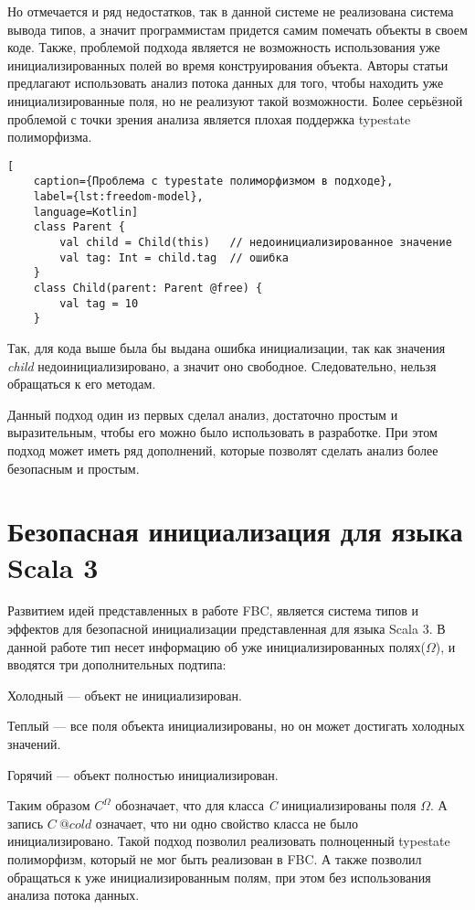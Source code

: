 Но отмечается и ряд недостатков, так в данной системе не реализована система вывода типов,
а значит программистам придется самим помечать объекты в своем коде.
Также, проблемой подхода является не возможность использования уже инициализированных полей во время конструирования объекта.
Авторы статьи предлагают использовать анализ потока данных для того, чтобы находить уже инициализированные поля,
но не реализуют такой возможности.
Более серьёзной проблемой с точки зрения анализа является плохая поддержка typestate полиморфизма.
\begin{lstlisting}[
    caption={Проблема c typestate полиморфизмом в подходе},
    label={lst:freedom-model},
    language=Kotlin]
    class Parent {
        val child = Child(this)   // недоинициализированное значение
        val tag: Int = child.tag  // ошибка
    }
    class Child(parent: Parent @free) {
        val tag = 10
    }
\end{lstlisting}
Так, для кода выше была бы выдана ошибка инициализации, так как значения \emph{child} недоинициализировано,
а значит оно свободное.
Следовательно, нельзя обращаться к его методам.

Данный подход один из первых сделал анализ, достаточно простым и выразительным, чтобы его можно было использовать в разработке.
При этом подход может иметь ряд дополнений, которые позволят сделать анализ более безопасным и простым.

\section{Безопасная инициализация для языка Scala 3}\label{sec:безопасная-инициализация-для-языка-scala-3}

Развитием идей представленных в работе FBC,
является система типов и эффектов для безопасной инициализации представленная для языка Scala 3\cite{safe-initialization-for-scala}.
В данной работе тип несет информацию об уже инициализированных полях($\Omega$), и вводятся три дополнительных подтипа:
\begin{itemize*}
    \item Холодный --- объект не инициализирован.
    \item Теплый --- все поля объекта инициализированы, но он может достигать холодных значений.
    \item Горячий --- объект полностью инициализирован.
\end{itemize*}
Таким образом $C^\Omega$ обозначает, что для класса \emph{C} инициализированы поля $\Omega$.
А запись $C~@cold$ означает, что ни одно свойство класса не было инициализировано.
Такой подход позволил реализовать полноценный typestate полиморфизм, который не мог быть реализован в FBC\@.
А также позволил обращаться к уже инициализированным полям, при этом без использования анализа потока данных.

